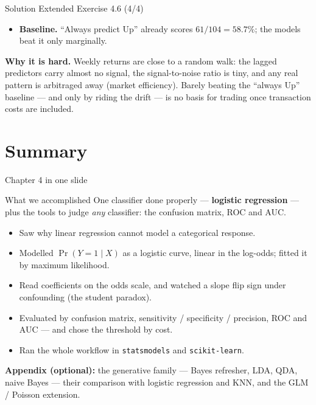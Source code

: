 \documentclass[aspectratio=169,11pt]{beamer}
\begin{document}
\begin{frame}{Solution \textemdash{} Extended Exercise 4.6 (4/4)}
\begin{solutionbox}
  \begin{itemize}
  \item \textbf{Baseline.} ``Always predict Up'' already scores
        $61/104=58.7\%$; the models beat it only marginally.
\end{itemize}
\textbf{Why it is hard.} Weekly returns are close to a random walk: the
lagged predictors carry almost no signal, the signal-to-noise ratio is
tiny, and any real pattern is arbitraged away (market efficiency). Barely
beating the ``always Up'' baseline --- and only by riding the drift --- is
no basis for trading once transaction costs are included.
\end{solutionbox}
\end{frame}

\section{Summary}

\begin{frame}{Chapter 4 in one slide}
  \begin{block}{What we accomplished}
    One classifier done properly --- \textbf{logistic regression} --- plus the
    tools to judge \emph{any} classifier: the confusion matrix, ROC and AUC.
  \end{block}
  \begin{itemize}
    \item Saw why linear regression cannot model a categorical response.
    \item Modelled $\Pr(Y=1\mid X)$ as a logistic curve, linear in the
          log-odds; fitted it by maximum likelihood.
    \item Read coefficients on the odds scale, and watched a slope flip
          sign under confounding (the student paradox).
    \item Evaluated by confusion matrix, sensitivity / specificity /
          precision, ROC and AUC --- and chose the threshold by cost.
    \item Ran the whole workflow in \texttt{statsmodels} and
          \texttt{scikit-learn}.
  \end{itemize}
  \vspace{1mm}
  {\footnotesize \textbf{Appendix (optional):} the generative family --- Bayes
  refresher, LDA, QDA, naive Bayes --- their comparison with logistic
  regression and KNN, and the GLM / Poisson extension.}
\end{frame}
\end{document}

